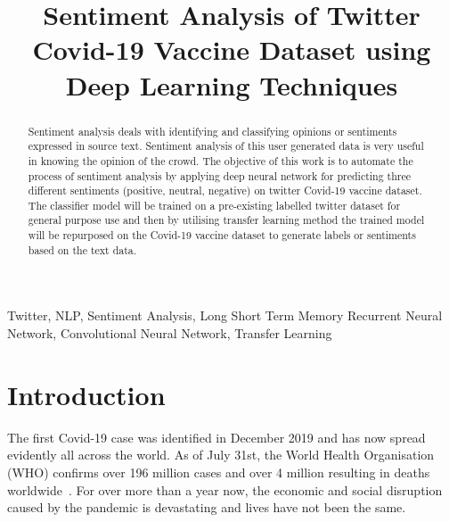 \documentclass[conference]{IEEEtran}
\begin{document}
\title{Sentiment Analysis of Twitter Covid-19 Vaccine Dataset using Deep Learning Techniques}

\author{

}

\maketitle

\begin{abstract}

Sentiment analysis deals with identifying and classifying opinions or sentiments expressed in source text. Sentiment analysis of this user generated data is very useful in knowing the opinion of the crowd. The objective of this work is to automate the process of sentiment analysis by applying deep neural network for predicting three different sentiments (positive, neutral, negative) on twitter Covid-19 vaccine dataset. The classifier model will be trained on a pre-existing labelled twitter dataset for general purpose use and then by utilising transfer learning method the trained model will be repurposed on the Covid-19 vaccine dataset to generate labels or sentiments based on the text data. 
\end{abstract}

\begin{IEEEkeywords}
Twitter, NLP, Sentiment Analysis, Long Short Term Memory Recurrent Neural Network, Convolutional Neural Network, Transfer Learning
\end{IEEEkeywords}


\section{Introduction} \label{sec:intro}
The first Covid-19 case was identified in December 2019 and has now spread evidently all across the world. As of July 31st, the World Health Organisation (WHO) confirms over 196 million cases and over 4 million resulting in deaths worldwide~\cite{dworld}. For over more than a year now, the economic and social disruption caused by the pandemic is devastating and lives have not been the same.
\end{document}
